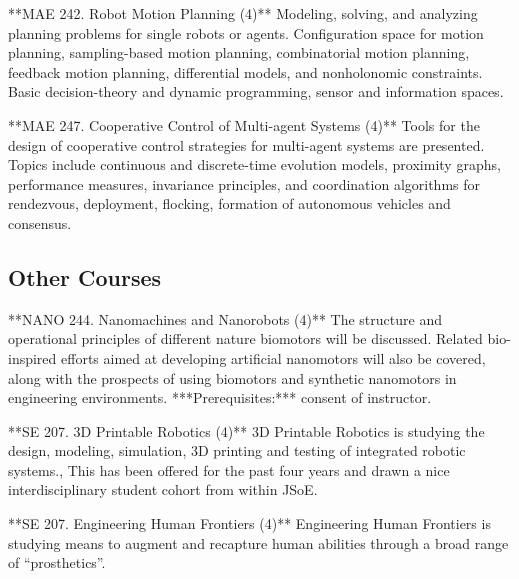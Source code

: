 \documentclass[11pt,letterpaper]{article}
\begin{document}
**MAE 242. Robot Motion Planning (4)** Modeling, solving, and analyzing
planning problems for single robots or agents. Configuration space for
motion planning, sampling-based motion planning, combinatorial motion
planning, feedback motion planning, differential models, and
nonholonomic constraints. Basic decision-theory and dynamic programming,
sensor and information spaces.

**MAE 247. Cooperative Control of Multi-agent Systems (4)** Tools for
the design of cooperative control strategies for multi-agent systems are
presented. Topics include continuous and discrete-time evolution models,
proximity graphs, performance measures, invariance principles, and
coordination algorithms for rendezvous, deployment, flocking, formation
of autonomous vehicles and consensus.

\subsection{Other Courses}

**NANO 244. Nanomachines and Nanorobots (4)** The structure and
operational principles of different nature biomotors will be
discussed. Related bio-inspired efforts aimed at developing artificial
nanomotors will also be covered, along with the prospects of using
biomotors and synthetic nanomotors in engineering
environments. ***Prerequisites:*** consent of instructor.

**SE 207. 3D Printable Robotics (4)** 3D Printable Robotics is
studying the design, modeling, simulation, 3D printing and testing of
integrated robotic systems., This has been offered for the past four
years and drawn a nice interdisciplinary student cohort from within
JSoE.

**SE 207. Engineering Human Frontiers (4)** Engineering Human
Frontiers is studying means to augment and recapture human abilities
through a broad range of “prosthetics”.



\end{document}
